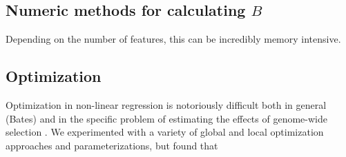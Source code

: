 \documentclass[11pt]{article}
\newcommand{\V}{\text{V}}
\begin{document}
\subsection*{Numeric methods for calculating $B$}

Depending on the number of features, this can be incredibly memory intensive.

\subsection*{Optimization}

Optimization in non-linear regression is notoriously difficult both in general
(Bates) and in the specific problem of estimating the effects of genome-wide
selection \parencite{Murphy2022-sj}. We experimented with a variety of global
and local optimization approaches and parameterizations, but found that 



















\end{document}
